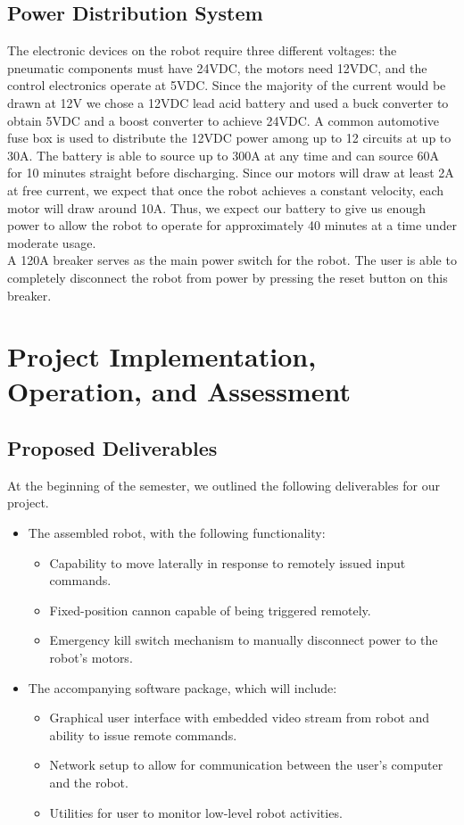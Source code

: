 \documentclass[letterpaper,12pt]{article}
\begin{document}
\subsection{Power Distribution System}
The electronic devices on the robot require three different voltages: the
pneumatic components must have 24VDC, the motors need 12VDC, and the control
electronics operate at 5VDC. Since the majority of the current would be drawn
at 12V we chose a 12VDC lead acid battery and used a buck converter to obtain
5VDC and a boost converter to achieve 24VDC. A common automotive fuse box is
used to distribute the 12VDC power among up to 12 circuits at up to 30A. The
battery is able to source up to 300A at any time and can source 60A for 10
minutes straight before discharging. Since our motors will draw at least 2A at
free current, we expect that once the robot achieves a constant velocity, each
motor will draw around 10A. Thus, we expect our battery to give us enough power
to allow the robot to operate for approximately 40 minutes at a time under
moderate usage.\\

A 120A breaker serves as the main power switch for the robot. The user is able
to completely disconnect the robot from power by pressing the reset button on
this breaker.

\section{Project Implementation, Operation, and Assessment}
\label{sec:implopassess}

\subsection{Proposed Deliverables}
At the beginning of the semester, we outlined the following deliverables for our
project.

\begin{itemize}
\item The assembled robot, with the following functionality:
  \begin{itemize}
  \item Capability to move laterally in response to remotely issued input commands.
  \item Fixed-position cannon capable of being triggered remotely.
  \item Emergency kill switch mechanism to manually disconnect power to the
    robot's motors.
  \end{itemize}
\item The accompanying software package, which will include:
  \begin{itemize}
  \item Graphical user interface with embedded video stream from robot and
    ability to issue remote commands.
  \item Network setup to allow for communication between the user's computer and
    the robot.
  \item Utilities for user to monitor low-level robot activities.
  \end{itemize}
\end{itemize}
\end{document}
